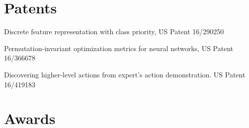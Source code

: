 \documentclass[letterpaper,11pt]{article}
\begin{document}
\begin{CV}

\end{CV}


\renewcommand{\refname}{Selected Publications}

{
\let\uline\relax
\nocite{Asai2022}
\nocite{Asai2022b}
\nocite{Asai2022c}
\nocite{Asai2021b}
\nocite{Asai2021c}
\nocite{Asai2020}
\nocite{Asai2020b}
\nocite{Asai2020c}
\nocite{Asai2019a}
\nocite{Asai2019b}
\nocite{Asai2018}
\nocite{Asai2017e}
\nocite{Asai2017b}
\nocite{Asai2017}
\nocite{Asai2016b}
\nocite{Asai2016}
\nocite{Asai2015}
\nocite{Asai2014}




}

\section{Patents}

\begin{CV}
 \item Discrete feature representation with class priority, US Patent 16/290250
 \item Permutation-invariant optimization metrics for neural networks, US Patent 16/366678
 \item Discovering higher-level actions from expert's action demonstration. US Patent 16/419183
\end{CV}

\section{Awards}
\end{document}
